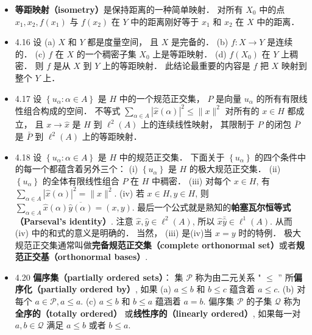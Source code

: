 \begin{itemize}
\item \textbf{等距映射（isometry）}是保持距离的一种简单映射． 对所有 $X_{0}$ 中的点 $x_{1}, x_{2}, f\left(x_{1}\right)$ 与 $f\left(x_{2}\right)$ 在 $Y$ 中的距离刚好等于 $x_{1}$ 和 $x_{2}$ 在 $X$ 中的距离．

\item 4.16 设 (a) $X$ 和 $Y$ 都是度量空间， 且 $X$ 是完备的． (b) $f: X \rightarrow Y$ 是连续的． (c) $f$ 在 $X$ 的一个稠密子集 $X_{0}$ 上是等距映射． (d) $f\left(X_{0}\right)$ 在 $Y$ 上稠密． 则 $f$ 是从 $X$ 到 $Y$ 上的等距映射． 此结论最重要的内容是 $f$ 把 $X$ 映射到整个 $Y$ 上．

\item 4.17 设 $\left\{u_{\alpha}: \alpha \in A\right\}$ 是 $H$ 中的一个规范正交集， $P$ 是向量 $u_{\alpha}$ 的所有有限线性组合构成的空间． 不等式 $\sum_{\alpha \in A}|\hat{x}(\alpha)|^{2} \leqslant\|x\|^{2}$ 对所有的 $x \in H$ 都成立， 且 $x \rightarrow \hat{x}$ 是 $H$ 到 $\ell^{2}(A)$ 上的连续线性映射， 其限制于 $P$ 的闭包 $\bar{P}$ 是 $\bar{P}$ 到 $\ell^{2}(A)$ 上的等距映射．

\item 4.18 设 $\left\{u_{\alpha}: \alpha \in A\right\}$ 是 $H$ 中的规范正交集． 下面关于 $\left\{u_{\alpha}\right\}$ 的四个条件中的每一个都蕴含着另外三个： (i) $\left\{u_{\alpha}\right\}$ 是 $H$ 的极大规范正交集． (ii) $\left\{u_{\alpha}\right\}$ 的全体有限线性组合 $P$ 在 $H$ 中稠密． (iii) 对每个 $x \in H$, 有 $\sum_{\alpha \in A}|\hat{x}(\alpha)|^{2}=\|x\|^{2}$. (iv) 若 $x \in H, y \in H$, 则 $\sum_{\alpha \in A} \hat{x}(\alpha) \overline{\hat{y}(\alpha)}=(x, y)$. 最后一个公式就是熟知的\textbf{帕塞瓦尔恒等式（Parseval's identity）}. 注意 $\hat{x},\hat{y} \in \ell^{2}(A)$, 所以 $\hat x\bar{\hat y} \in \ell^1(A)$. 从而 (iv) 中的和式的意义是明确的． 当然， (iii) 是(iv)当 $x=y$ 时的特例． 极大规范正交集通常叫做\textbf{完备规范正交集（complete orthonormal set）}或者\textbf{规范正交基（orthonormal bases）}.

\item 4.20 \textbf{偏序集（partially ordered sets）}： 集 $\mathscr{P}$ 称为由二元关系 " $\leqslant$ ” 所\textbf{偏序化（partially ordered by）}, 如果 (a) $a \leqslant b$ 和 $b \leqslant c$ 蕴含着 $a \leqslant c$. (b) 对每个 $a \in \mathscr{P}, a \leqslant a$. (c) $a \leqslant b$ 和 $b \leqslant a$ 蕴涵着 $a=b$. 偏序集 $\mathscr{P}$ 的子集 $\mathscr{Q}$ 称为\textbf{全序的（totally ordered）} 或\textbf{线性序的（linearly ordered）}, 如果每一对 $a, b \in \mathscr{Q}$ 满足 $a \leqslant b$ 或者 $b \leqslant a$.


\end{itemize}
